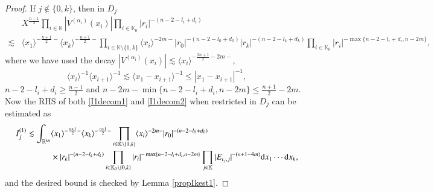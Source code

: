 \documentclass[11pt,reqno]{amsart}
\def\d{{\rm d}}
\numberwithin{equation}{section}
\theoremstyle{definition}
\begin{document}
\begin{proof}
	If $j\notin\{0,k\}$, then in $D_j$
	\begin{equation*}
		\begin{split}
			&X^\frac{n-1}{2}\prod_{i\in\mathbb{K}}|V^{(\alpha_i)}(x_i)|\prod_{i\in\mathbb{K}_0}|r_i|^{-(n-2-l_i+d_i)}\\
			\lesssim&\langle x_1\rangle^{-\frac{n+1}{2}-}\langle x_k\rangle^{-\frac{n+1}{2}-}\prod_{i\in\mathbb{K}\setminus\{1,k\}}\langle x_i\rangle^{-2m-}|r_0|^{-(n-2-l_0+d_0)}|r_k|^{-(n-2-l_k+d_k)}\prod_{i\in\mathbb{K}_0}|r_i|^{-\max\{n-2-l_i+d_i,n-2m\}},
		\end{split}
	\end{equation*}
	where we have used the decay $|V^{(\alpha_i)}(x_i)|\lesssim\langle x_i\rangle^{-\frac{3n+1}{2}-2m-}$,
	\begin{equation}\label{fangsuo}
		\langle x_i\rangle^{-1}\langle x_{i+1}\rangle^{-1}\lesssim\langle x_1-x_{i+1}\rangle^{-1}\leq|x_1-x_{i+1}|^{-1},	
	\end{equation}
	$n-2-l_i+d_i\geq\frac{n-1}{2}$ and $n-2m-\min\{n-2-l_i+d_i,n-2m\}\leq\frac{n+1}{2}-2m$. Now the RHS of both \eqref{I1decom1} and \eqref{I1decom2} when restricted in $D_j$ can be estimated as
	\begin{equation*}
		\begin{split}
			I^{(1)}_j\lesssim\int_{\mathbb{R}^{kn}}&\langle x_1\rangle^{-\frac{n+1}{2}-}\langle x_k\rangle^{-\frac{n+1}{2}-}\prod_{i\in\mathbb{K}\setminus\{1,k\}}\langle x_i\rangle^{-2m-}|r_0|^{-(n-2-l_0+d_0)}\\
			&\times|r_k|^{-(n-2-l_k+d_k)}\prod_{i\in\mathbb{K}_0\setminus\{0,k\}}|r_i|^{-\max\{n-2-l_i+d_i,n-2m\}}\prod_{j\in\mathbb{K}}|E_{\iota_j,j}|^{-(n+1-4m)}\d x_1\cdots\d x_k,
		\end{split}
	\end{equation*}
	and the desired bound is checked by Lemma \ref{propIkest1}.
	

\end{proof}
\end{document}
